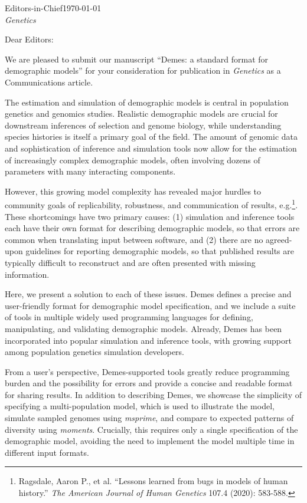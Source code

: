 \documentclass[11pt]{article}
\begin{document}
Editors-in-Chief\hfill\today\\
\emph{Genetics}

Dear Editors:

We are pleased to submit our manuscript “Demes: a standard format for
demographic models” for your consideration for publication in \emph{Genetics}
as a Communications article.

The estimation and simulation of demographic models is central in population
genetics and genomics studies. Realistic demographic models are crucial for
downstream inferences of selection and genome biology, while understanding
species histories is itself a primary goal of the field. The amount of genomic
data and sophistication of inference and simulation tools now allow for the
estimation of increasingly complex demographic models, often involving dozens
of parameters with many interacting components.

However, this growing model complexity has revealed major hurdles to community
goals of replicability, robustness, and communication of
results, e.g.\footnote{Ragsdale, Aaron P., et al. ``Lessons learned from bugs in
models of human history.'' \emph{The American Journal of Human Genetics}
107.4 (2020): 583-588.}. These shortcomings have two primary causes: (1)
simulation and inference tools each have their own format for describing
demographic models, so that errors are common when translating input between
software, and (2) there are no agreed-upon guidelines for reporting demographic
models, so that published results are typically difficult to reconstruct and
are often presented with missing information.

Here, we present a solution to each of these issues. Demes defines a precise
and user-friendly format for demographic model specification, and we include a
suite of tools in multiple widely used programming languages for defining,
manipulating, and validating demographic models. Already, Demes has been
incorporated into popular simulation and inference tools, with growing support
among population genetics simulation developers.

From a user’s perspective, Demes-supported tools greatly reduce programming
burden and the possibility for errors and provide a concise and readable format
for sharing results. In addition to describing Demes, we showcase the
simplicity of specifying a multi-population model, which is used to illustrate
the model, simulate sampled genomes using \emph{msprime}, and compare to
expected patterns of diversity using \emph{moments}. Crucially, this requires
only a single specification of the demographic model, avoiding the need to
implement the model multiple time in different input formats.
\end{document}
